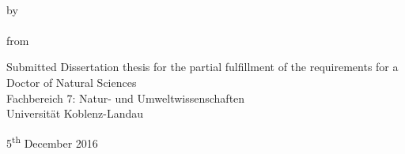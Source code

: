 
\begin{titlepage}
    \begin{center}
        \vspace*{3cm}
        \begingroup
            \textbf{\LARGE\spacedallcaps{\myTitleOnTitlePageLineOne}}\\[0.8em]
            \spacedallcaps{\myTitleOnTitlePageLineTwo}
        \endgroup
        
        \vfill

        \begingroup
            by\\[1em]
            \Large \spacedlowsmallcaps{\myName} \\
            \small from \spacedlowsmallcaps{\myLocation}
        \endgroup

        \vfill

        \begingroup
            \small
        	Submitted Dissertation thesis for the partial fulfillment of the requirements for a \\
        	Doctor of Natural Sciences \\
            Fachbereich 7: Natur- und Umweltwissenschaften \\
        	Universität Koblenz-Landau
        \endgroup

        \vfill

        5\textsuperscript{th} December 2016
                   

    \end{center}       
\end{titlepage}   
 
